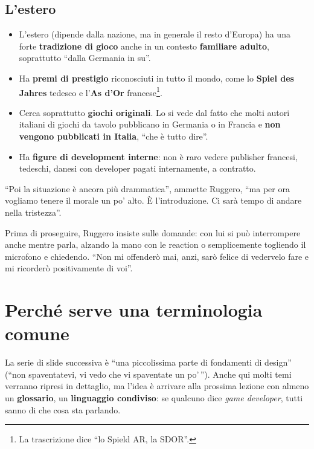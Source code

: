 \subsection{L'estero}

\begin{itemize}
  \item L'estero (dipende dalla nazione, ma in generale il resto d'Europa) ha una
        forte \textbf{tradizione di gioco} anche in un contesto \textbf{familiare
        adulto}, soprattutto ``dalla Germania in su''.
  \item Ha \textbf{premi di prestigio} riconosciuti in tutto il mondo, come lo
        \textbf{Spiel des Jahres} tedesco e l'\textbf{As d'Or} francese\footnote{La
        trascrizione dice ``lo Spield AR, la SDOR''.}.
  \item Cerca soprattutto \textbf{giochi originali}. Lo si vede dal fatto che
        molti autori italiani di giochi da tavolo pubblicano in Germania o in
        Francia e \textbf{non vengono pubblicati in Italia}, ``che è tutto
        dire''.
  \item Ha \textbf{figure di development interne}: non è raro vedere publisher
        francesi, tedeschi, danesi con developer pagati internamente, a
        contratto.
\end{itemize}
``Poi la situazione è ancora più drammatica'', ammette Ruggero, ``ma per ora
vogliamo tenere il morale un po' alto. È l'introduzione. Ci sarà tempo di andare
nella tristezza''.

Prima di proseguire, Ruggero insiste sulle domande: con lui si può interrompere
anche mentre parla, alzando la mano con le reaction o semplicemente togliendo il
microfono e chiedendo. ``Non mi offenderò mai, anzi, sarò felice di vedervelo
fare e mi ricorderò positivamente di voi''.

\section{Perché serve una terminologia comune}
\label{a1:sec:terminologia}

La serie di slide successiva è ``una piccolissima parte di fondamenti di
design'' (``non spaventatevi, vi vedo che vi spaventate un po'\,''). Anche qui
molti temi verranno ripresi in dettaglio, ma l'idea è arrivare alla prossima
lezione con almeno un \textbf{glossario}, un \textbf{linguaggio condiviso}: se
qualcuno dice \emph{game developer}, tutti sanno di che cosa sta parlando.

